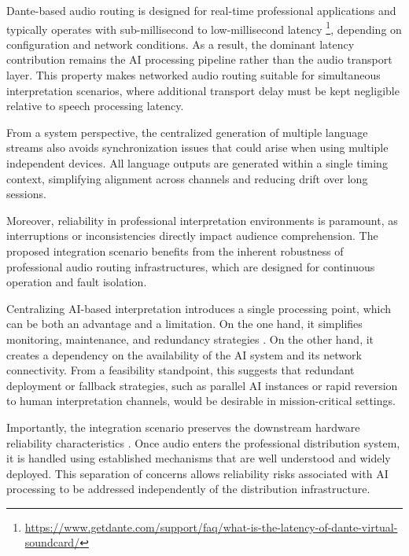 Dante-based audio routing is designed for real-time professional applications and typically operates with sub-millisecond to low-millisecond latency \footnote{\url{https://www.getdante.com/support/faq/what-is-the-latency-of-dante-virtual-soundcard/}}, depending on configuration and network conditions. As a result, the dominant latency contribution remains the AI processing pipeline rather than the audio transport layer. This property makes networked audio routing suitable for simultaneous interpretation scenarios, where additional transport delay must be kept negligible relative to speech processing latency.

From a system perspective, the centralized generation of multiple language streams also avoids synchronization issues that could arise when using multiple independent devices. All language outputs are generated within a single timing context, simplifying alignment across channels and reducing drift over long sessions.


Moreover, reliability in professional interpretation environments is paramount, as interruptions or inconsistencies directly impact audience comprehension. The proposed integration scenario benefits from the inherent robustness of professional audio routing infrastructures, which are designed for continuous operation and fault isolation.

Centralizing AI-based interpretation introduces a single processing point, which can be both an advantage and a limitation. On the one hand, it simplifies monitoring, maintenance, and redundancy strategies \cite{sperber2020endtoendpromise}. On the other hand, it creates a dependency on the availability of the AI system and its network connectivity. From a feasibility standpoint, this suggests that redundant deployment or fallback strategies, such as parallel AI instances or rapid reversion to human interpretation channels, would be desirable in mission-critical settings.

Importantly, the integration scenario preserves the downstream hardware reliability characteristics \cite{conference_interpreting_new_tech}. Once audio enters the professional distribution system, it is handled using established mechanisms that are well understood and widely deployed. This separation of concerns allows reliability risks associated with AI processing to be addressed independently of the distribution infrastructure.

